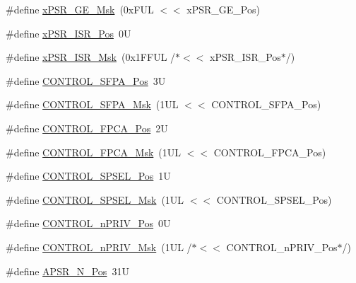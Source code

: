 \begin{DoxyCompactItemize}
\item 
\#define \hyperlink{group___c_m_s_i_s___c_o_r_e_ga967634e605d013e9b07002eca31f7903}{x\+P\+S\+R\+\_\+\+G\+E\+\_\+\+Msk}~(0x\+F\+U\+L $<$$<$ x\+P\+S\+R\+\_\+\+G\+E\+\_\+\+Pos)
\item 
\#define \hyperlink{group___c_m_s_i_s___c_o_r_e_ga21bff245fb1aef9683f693d9d7bb2233}{x\+P\+S\+R\+\_\+\+I\+S\+R\+\_\+\+Pos}~0U
\item 
\#define \hyperlink{group___c_m_s_i_s___c_o_r_e_gadf8eed87e0081dfe1ef1c78a0ea91afd}{x\+P\+S\+R\+\_\+\+I\+S\+R\+\_\+\+Msk}~(0x1\+F\+F\+U\+L /$\ast$$<$$<$ x\+P\+S\+R\+\_\+\+I\+S\+R\+\_\+\+Pos$\ast$/)
\item 
\#define \hyperlink{group___c_m_s_i_s___c_o_r_e_gac4eb493f7e00c0b286f6663b2554d5f1}{C\+O\+N\+T\+R\+O\+L\+\_\+\+S\+F\+P\+A\+\_\+\+Pos}~3U
\item 
\#define \hyperlink{group___c_m_s_i_s___c_o_r_e_gae1af7c6a3a6482a32ae290b66db3a3f8}{C\+O\+N\+T\+R\+O\+L\+\_\+\+S\+F\+P\+A\+\_\+\+Msk}~(1\+U\+L $<$$<$ C\+O\+N\+T\+R\+O\+L\+\_\+\+S\+F\+P\+A\+\_\+\+Pos)
\item 
\#define \hyperlink{group___c_m_s_i_s___c_o_r_e_gac7018b59b07134c5363b33eb94918a58}{C\+O\+N\+T\+R\+O\+L\+\_\+\+F\+P\+C\+A\+\_\+\+Pos}~2U
\item 
\#define \hyperlink{group___c_m_s_i_s___c_o_r_e_gad20bb0212b2e1864f24af38d93587c79}{C\+O\+N\+T\+R\+O\+L\+\_\+\+F\+P\+C\+A\+\_\+\+Msk}~(1\+U\+L $<$$<$ C\+O\+N\+T\+R\+O\+L\+\_\+\+F\+P\+C\+A\+\_\+\+Pos)
\item 
\#define \hyperlink{group___c_m_s_i_s___c_o_r_e_ga07eafc53e609895342c6a530e9d01310}{C\+O\+N\+T\+R\+O\+L\+\_\+\+S\+P\+S\+E\+L\+\_\+\+Pos}~1U
\item 
\#define \hyperlink{group___c_m_s_i_s___c_o_r_e_ga70b29840969b06909da21369b0b05b53}{C\+O\+N\+T\+R\+O\+L\+\_\+\+S\+P\+S\+E\+L\+\_\+\+Msk}~(1\+U\+L $<$$<$ C\+O\+N\+T\+R\+O\+L\+\_\+\+S\+P\+S\+E\+L\+\_\+\+Pos)
\item 
\#define \hyperlink{group___c_m_s_i_s___c_o_r_e_ga51b95bc03ec0d815b459bde0b14a5908}{C\+O\+N\+T\+R\+O\+L\+\_\+n\+P\+R\+I\+V\+\_\+\+Pos}~0U
\item 
\#define \hyperlink{group___c_m_s_i_s___c_o_r_e_gaef3b20d77acb213338f89ce5e7bc36b0}{C\+O\+N\+T\+R\+O\+L\+\_\+n\+P\+R\+I\+V\+\_\+\+Msk}~(1\+U\+L /$\ast$$<$$<$ C\+O\+N\+T\+R\+O\+L\+\_\+n\+P\+R\+I\+V\+\_\+\+Pos$\ast$/)
\item 
\#define \hyperlink{group___c_m_s_i_s___c_o_r_e_gac469528d210043c7bd3f12f0e6824766}{A\+P\+S\+R\+\_\+\+N\+\_\+\+Pos}~31U
\item 

\end{DoxyCompactItemize}
